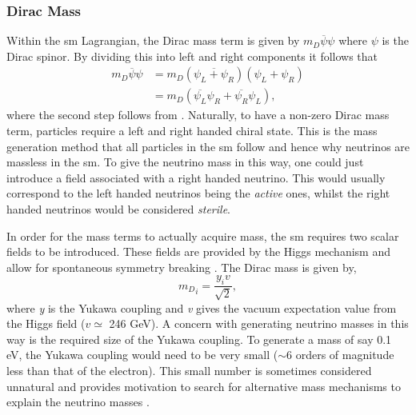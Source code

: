 \subsubsection{Dirac Mass}
Within the \gls{sm} Lagrangian, the Dirac mass term is given by $m_D\overline{\psi}\psi$ where $\psi$ is the Dirac spinor. By dividing this into left and right components it follows that
\begin{equation}\label{eqn:Dirac mass term}
\begin{split}
    m_D\overline{\psi}\psi &= m_D(\overline{\psi_L + \psi_R})(\psi_L + \psi_R) \\
    &= m_D(\overline{\psi_L}\psi_R + \overline{\psi_R}\psi_L),
\end{split}
\end{equation} 
where the second step follows from . Naturally, to have a non-zero Dirac mass term, particles require a left and right handed chiral state. This is the mass generation method that all particles in the \gls{sm} follow and hence why neutrinos are massless in the \gls{sm}. To give the neutrino mass in this way, one could just introduce a field associated with a right handed neutrino. This would usually correspond to the left handed neutrinos being the \textit{active} ones, whilst the right handed neutrinos would be considered \textit{sterile}.

In order for the mass terms to actually acquire mass, the \gls{sm} requires two scalar fields to be introduced. These fields are provided by the Higgs mechanism and allow for spontaneous symmetry breaking \cite{peskin_and_schroeder}. The Dirac mass is given by, 
\begin{equation}
    {m_D}_i = \frac{y_iv}{\sqrt{2}},
\end{equation}
where \textit{y} is the Yukawa coupling and \textit{v} gives the vacuum expectation value from the Higgs field ($v \simeq$ 246 GeV). A concern with generating neutrino masses in this way is the required size of the Yukawa coupling. To generate a mass of say 0.1 eV, the Yukawa coupling would need to be very small ($\sim$6 orders of magnitude less than that of the electron). This small number is sometimes considered unnatural and provides motivation to search for alternative mass mechanisms to explain the neutrino masses \cite{Fundamentals_of_Neutrino_Physics_and_Astrophysics}.

